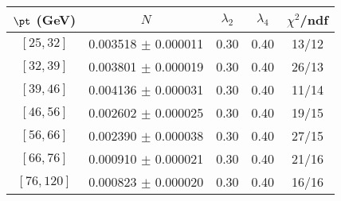 \begin{tabular}{c||c|c|c|c}
$\pt$ (GeV) & $N$ & $\lambda_{2}$ & $\lambda_4$  & $\chi^2$/ndf  \\
\hline
$[25, 32]$ & 0.003518 $\pm$ 0.000011 & 0.30 & 0.40 & 13/12\\
$[32, 39]$ & 0.003801 $\pm$ 0.000019 & 0.30 & 0.40 & 26/13\\
$[39, 46]$ & 0.004136 $\pm$ 0.000031 & 0.30 & 0.40 & 11/14\\
$[46, 56]$ & 0.002602 $\pm$ 0.000025 & 0.30 & 0.40 & 19/15\\
$[56, 66]$ & 0.002390 $\pm$ 0.000038 & 0.30 & 0.40 & 27/15\\
$[66, 76]$ & 0.000910 $\pm$ 0.000021 & 0.30 & 0.40 & 21/16\\
$[76, 120]$ & 0.000823 $\pm$ 0.000020 & 0.30 & 0.40 & 16/16\\
\end{tabular}
